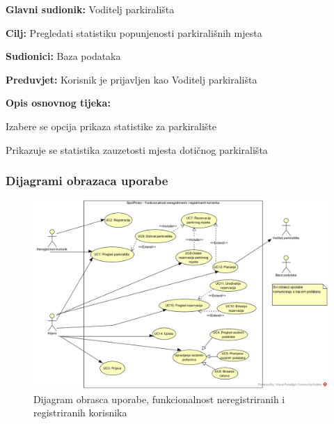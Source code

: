 \noindent {}
\begin{packed_item}

\item \textbf{Glavni sudionik: }Voditelj parkirališta
\item  \textbf{Cilj:} Pregledati statistiku popunjenosti parkirališnih mjesta
\item  \textbf{Sudionici:} Baza podataka
\item  \textbf{Preduvjet:} Korisnik je prijavljen kao Voditelj parkirališta
\item  \textbf{Opis osnovnog tijeka:}

\item[] \begin{packed_enum}
	
	\item Izabere se opcija prikaza statistike za parkiralište
	\item Prikazuje se statistika zauzetosti mjesta dotičnog parkirališta
	
	
\end{packed_enum}

\end{packed_item}




\subsubsection{Dijagrami obrazaca uporabe}


\begin{figure}[H]
\centering
\includegraphics[width=\textwidth]{slike/UCD1.jpg} 
\caption{Dijagram obrasca uporabe, funkcionalnost neregistriranih i registriranih korisnika}
\label{fig:promjene6} 
\end{figure}


